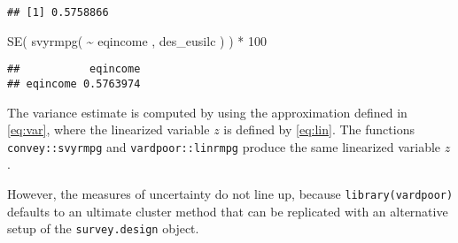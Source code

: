 \documentclass[
]{book}
\newenvironment{Shaded}{\begin{snugshade}}{\end{snugshade}}
\newcommand{\CommentTok}[1]{\textcolor[rgb]{0.56,0.35,0.01}{\textit{#1}}}
\newcommand{\DecValTok}[1]{\textcolor[rgb]{0.00,0.00,0.81}{#1}}
\newcommand{\FunctionTok}[1]{\textcolor[rgb]{0.00,0.00,0.00}{#1}}
\newcommand{\NormalTok}[1]{#1}
\newcommand{\SpecialCharTok}[1]{\textcolor[rgb]{0.00,0.00,0.00}{#1}}
\begin{document}
\begin{Shaded}
\end{Shaded}

\begin{verbatim}
## [1] 0.5758866
\end{verbatim}

\begin{Shaded}
\begin{Highlighting}[]
\FunctionTok{SE}\NormalTok{( }\FunctionTok{svyrmpg}\NormalTok{( }\SpecialCharTok{\textasciitilde{}}\NormalTok{ eqincome , des\_eusilc ) ) }\SpecialCharTok{*} \DecValTok{100}
\end{Highlighting}
\end{Shaded}

\begin{verbatim}
##           eqincome
## eqincome 0.5763974
\end{verbatim}

The variance estimate is computed by using the approximation defined in \eqref{eq:var}, where the linearized variable \(z\) is defined by \eqref{eq:lin}. The functions \texttt{convey::svyrmpg} and \texttt{vardpoor::linrmpg} produce the same linearized variable \(z\).

However, the measures of uncertainty do not line up, because \texttt{library(vardpoor)} defaults to an ultimate cluster method that can be replicated with an alternative setup of the \texttt{survey.design} object.
\end{document}
